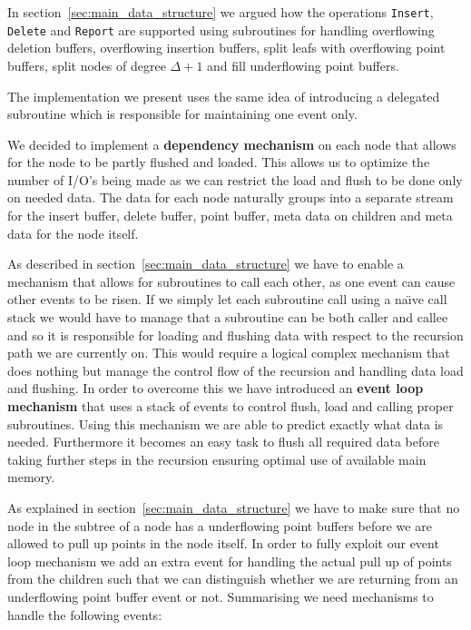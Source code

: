 \documentclass[twoside,11pt,openright]{report}
\begin{document}
In section~\ref{sec:main_data_structure} we argued how the operations \texttt{Insert}, \texttt{Delete} and \texttt{Report} are supported using subroutines for handling overflowing deletion buffers, overflowing insertion buffers, split leafs with overflowing point buffers, split nodes of degree $\Delta+1$ and fill underflowing point buffers.

The implementation we present uses the same idea of introducing a delegated subroutine which is responsible for maintaining one event only.

We decided to implement a \textbf{dependency mechanism} on each node that allows for the node to be partly flushed and loaded. This allows us to optimize the number of I/O's being made as we can restrict the load and flush to be done only on needed data. The data for each node naturally groups into a separate stream for the insert buffer, delete buffer, point buffer, meta data on children and meta data for the node itself. %

As described in section~\ref{sec:main_data_structure} we have to enable a mechanism that allows for subroutines to call each other, as one event can cause other events to be risen. If we simply let each subroutine call using a na\"{\i}ve call stack we would have to manage that a subroutine can be both caller and callee and so it is responsible for loading and flushing data with respect to the recursion path we are currently on. This would require a logical complex mechanism that does nothing but manage the control flow of the recursion and handling data load and flushing. In order to overcome this we have introduced an \textbf{event loop mechanism} that uses a stack of events to control flush, load and calling  proper subroutines. Using this mechanism we are able to predict exactly what data is needed. Furthermore it becomes an easy task to flush all required data before taking further steps in the recursion ensuring optimal use of available main memory.

As explained in section~\ref{sec:main_data_structure} we have to make sure that no node in the subtree of a node has a underflowing point buffers before we are allowed to pull up points in the node itself. In order to fully exploit our event loop mechanism we add an extra event for handling the actual pull up of points from the children such that we can distinguish whether we are returning from an underflowing point buffer event or not. Summarising we need mechanisms to handle the following events:
\end{document}
